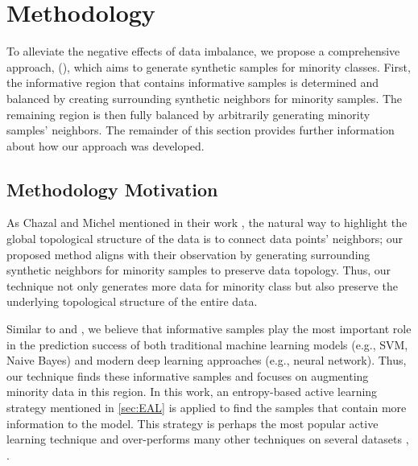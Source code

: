 

\section{Methodology}
\label{sec:SIMPOR_method}
To alleviate the negative effects of data imbalance, we propose a comprehensive approach, \MethodnameLong{} (\Methodname), which aims to generate synthetic samples for minority classes. First, the informative region that contains informative samples is determined and balanced by creating surrounding synthetic neighbors for minority samples. The remaining region is then fully balanced by arbitrarily generating minority samples' neighbors. The remainder of this section provides further information about how our approach was developed.  

\subsection{Methodology Motivation}  
As Chazal and Michel mentioned in their work \cite{leroueil_compressibility_1996}, the natural way to highlight the global topological structure of the data is to connect data points' neighbors; our proposed method aligns with their observation by generating surrounding synthetic neighbors for minority samples to preserve data topology. Thus, our technique not only generates more data for minority class but also preserve the underlying topological structure of the entire data. 

Similar to \cite{ertekin_learning_2007} and \cite{aggarwal_active_2020}, we believe that informative samples play the most important role in the prediction success of both traditional machine learning models (e.g., SVM, Naive Bayes) and modern deep learning approaches (e.g., neural network). Thus, our technique finds these informative samples and focuses on augmenting minority data in this region. In this work, an entropy-based active learning strategy mentioned in \ref{sec:EAL} is applied to find the samples that contain more information to the model. This strategy is perhaps the most popular active learning technique and over-performs many other techniques on several datasets \cite{DAL}, \cite{7393573} \cite{settles_analysis_2008}.

